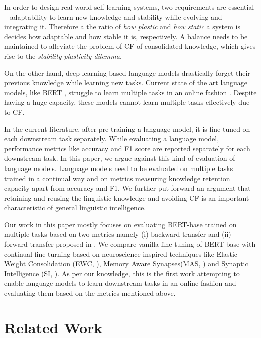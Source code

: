 \documentclass[11pt,a4paper]{article}
\begin{document}
In order to design real-world self-learning systems, two requirements are essential -- adaptability to learn new knowledge and stability while evolving and integrating it. Therefore a the ratio of \textit{how plastic} and \textit{how static} a system is decides how adaptable and how stable it is, respectively. A balance needs to be maintained to alleviate the problem of CF of consolidated knowledge, which gives rise to the \textit{stability-plasticity dilemma}.



On the other hand, deep learning based language models drastically forget their previous knowledge while learning new tasks. Current state of the art language models, like BERT \cite{DBLP:journals/corr/abs-1810-04805}, struggle to learn multiple tasks in an online fashion \cite{DBLP:journals/corr/abs-1901-11373}. Despite having a huge capacity, these models cannot learn multiple tasks effectively due to CF.  

In the current literature, after pre-training a language model, it is fine-tuned on each downstream task separately. While evaluating a language model, performance metrics like accuracy and F1 score are reported separately for each downstream task. In this paper, we argue against this kind of evaluation of language models. Language models need to be evaluated on multiple tasks trained in a continual way and on metrics measuring knowledge retention capacity apart from accuracy and F1.  We further put forward an argument that retaining and reusing the linguistic knowledge and avoiding CF is an important characteristic of general linguistic intelligence.  

Our work in this paper mostly focuses on evaluating BERT-base trained on multiple tasks based on two metrics namely (i) backward transfer and (ii) forward transfer proposed in \citeauthor{DBLP:journals/corr/Lopez-PazR17}.  We compare vanilla fine-tuning of BERT-base with continual fine-turning based on neuroscience inspired techniques like Elastic Weight Consolidation (EWC, \citealt{DBLP:journals/corr/KirkpatrickPRVD16}), Memory Aware Synapses(MAS, \citealt{aljundi2018memory}) and Synaptic Intelligence (SI, \cite{Cortes2017AdaNetAS}).  As per our knowledge, this is the first work attempting to enable language models to learn downstream tasks in an online fashion and evaluating them based on the metrics mentioned above.

\section{Related Work}
\label{sec:related}
\end{document}
